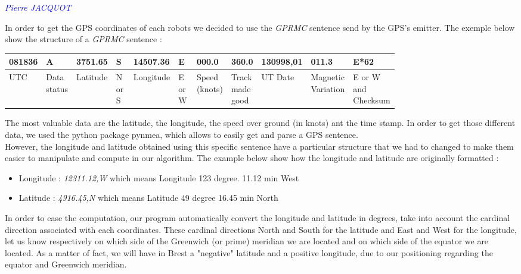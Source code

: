 \textcolor{blue}{\textit{Pierre JACQUOT}}

In order to get the GPS coordinates of each robots we decided to use the \textit{GPRMC} sentence send by the GPS's emitter. The exemple below show the structure of a \textit{GPRMC} sentence : \
\begin{center}
\begin{tabular}{|m{0.05\linewidth}|m{0.06\linewidth}|m{0.07\linewidth}|m{0.07\linewidth}|m{0.08\linewidth}|m{0.07\linewidth}|m{0.07\linewidth}|m{0.04\linewidth}|m{0.08\linewidth}|m{0.1\linewidth}|m{0.07\linewidth}|}
\hline
    081836 & A & 3751.65 & S & 14507.36 & E & 000.0 & 360.0 & 130998,01 & 011.3 & E*62  \\ \hline
     UTC & Data status & Latitude & N or S & Longitude & E or W & Speed (knots) & Track made good &  UT Date & Magnetic Variation & E or W and Checksum \\ \hline

\end{tabular}
\end{center}

The most valuable data are the latitude, the longitude, the speed over ground (in knots) ant the time stamp. In order to get those different data, we used the python package pynmea, which allows to easily get and parse a GPS sentence. \\
However, the longitude and latitude obtained using this specific sentence have a particular structure that we had to changed to make them easier to manipulate and compute in our algorithm. The example below show how the longitude and latitude are originally formatted :
\\
\begin{itemize}
  \item Longitude  : \textit{12311.12,W} which means Longitude 123 degree. 11.12 min West
  \item Latitude : \textit{4916.45,N} which means Latitude 49 degree 16.45 min North
\end{itemize}

In order to ease the computation, our program automatically convert the longitude and latitude in degrees, take into account the cardinal direction associated with each coordinates.
These cardinal directions North and South for the latitude and East and West for the longitude, let us know respectively on which side of the Greenwich (or prime) meridian we are located and on which side of the equator we are located. As a matter of fact, we will have in Brest a "negative" latitude and a positive longitude, due to our positioning regarding the equator and Greenwich meridian.\\

